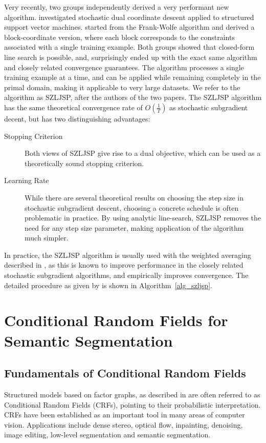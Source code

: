 Very recently, two groups independently derived a very performant new algorithm.
\citet{shalev2012proximal} investigated stochastic dual coordinate descent applied
to structured support vector machines. \citet{lacoste2012block} started from the Frank-Wolfe algorithm %
and derived a block-coordinate version, where each block corresponds to the
constraints associated with a single training example.  Both groups showed that
closed-form line search is possible, and, surprisingly ended up with the exact
same algorithm and closely related convergence guarantees.  The algorithm
processes a single training example at a time, and can be applied while
remaining completely in the primal domain, making it applicable to very large
datasets.  We refer to the algorithm as SZLJSP, after the authors of the
two papers.
%
The SZLJSP algorithm has the same theoretical convergence rate of $O(\frac{1}{T})$
as stochastic subgradient decent, but has two distinguishing advantages:
\begin{description}
\item[Stopping Criterion] Both views of SZLJSP give rise to a dual objective,
    which can be used as a theoretically sound stopping criterion.
\item[Learning Rate] While there are several theoretical results on choosing
    the step size in stochastic subgradient descent, choosing a concrete
    schedule is often problematic in practice. By using analytic line-search,
    SZLJSP removes the need for any step size parameter, making application
    of the algorithm much simpler.
\end{description}

In practice, the SZLJSP algorithm is usually used with the weighted averaging
described in , as this is known to improve performance in the
closely related stochastic subgradient algorithms, and empirically improves
convergence.
\enlargethispage{10mm}
The detailed procedure as given by \citet{lacoste2012block} is shown in Algorithm~\ref{alg_szljsp}.


\section{Conditional Random Fields for Semantic Segmentation}
%
\subsection{Fundamentals of Conditional Random Fields}
Structured models based on factor graphs, as described in  are often
referred to as Conditional Random Fields (CRFs), pointing to their
probabilistic interpretation.
CRFs have been established as an important tool in many areas of computer
vision. Applications include dense stereo, optical flow, inpainting,
denoising, image editing, low-level segmentation and semantic segmentation.


